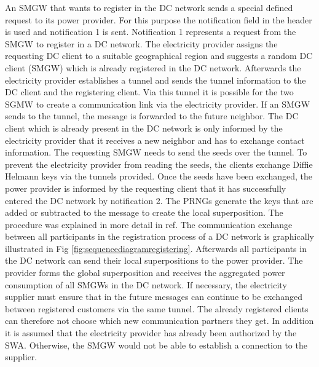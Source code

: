 An SMGW that wants to register in the DC network sends a special defined request to its power provider. For this purpose the notification field in the header is used and notification 1 is sent. Notification 1 represents a request from the SMGW to register in a DC network. The electricity provider assigns the requesting DC client to a suitable geographical region and suggests a random DC client (SMGW) which is already registered in the DC network. Afterwards the electricity provider establishes a tunnel and sends the tunnel information to the DC client and the registering client. Via this tunnel it is possible for the two SGMW to create a communication link via the electricity provider. If an SMGW sends to the tunnel, the message is forwarded to the future neighbor. The DC client which is already present in the DC network is only informed by the electricity provider that it receives a new neighbor and has to exchange contact information. The requesting SMGW needs to send the seeds over the tunnel. To prevent the electricity provider from reading the seeds, the clients exchange Diffie Helmann keys via the tunnels provided.%
Once the seeds have been exchanged, the power provider is informed by the requesting client that it has successfully entered the DC network by notification 2. The PRNGs generate the keys that are added or subtracted to the message to create the local superposition. The procedure was explained in more detail in ref.%
The communication exchange between all participants in the registration process of a DC network is graphically illustrated in Fig \ref{fig:sequencediagramregistering}. %
Afterwards all participants in the DC network can send their local superpositions to the power provider. The provider forms the global superposition and receives the aggregated power consumption of all SMGWs in the DC network. If necessary, the electricity supplier must ensure that in the future messages can continue to be exchanged between registered customers via the same tunnel. The already registered clients can therefore not choose which new communication partners they get. In addition it is assumed that the electricity provider has already been authorized by the SWA. Otherwise, the SMGW would not be able to establish a connection to the supplier.\\
